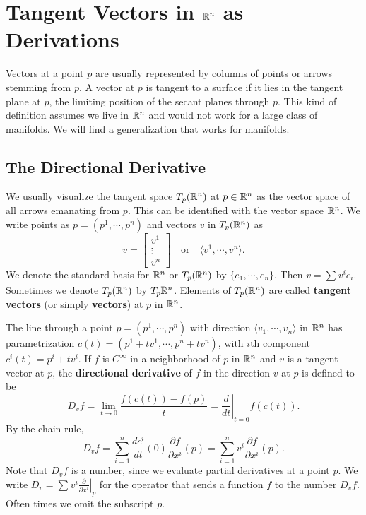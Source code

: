 \section{Tangent Vectors in $\mathbb{R}^n $ as Derivations}
Vectors at a point $p$ are usually represented by columns of points or arrows stemming from $p$. A vector at $p$ is tangent to a surface if it lies in the tangent plane at $p$, the limiting position of the secant planes through $p$. This kind of definition assumes we live in $\mathbb{R}^n $ and would not work for a large class of manifolds. We will find a generalization that works for manifolds.
\subsection{The Directional Derivative}
We usually visualize the tangent space $T_p (\mathbb{R}^n )$ at $p\in \mathbb{R}^n $ as the vector space of all arrows emanating from $p$. This can be identified with the vector space $\mathbb{R}^n $. We write points as $p=(p^1,\cdots ,p^n )$ and vectors $v$ in $T_p(\mathbb{R}^n )$ as \[
v= 
\begin{bmatrix}
    v^1 \\ \vdots \\ v^n 
\end{bmatrix} \quad \text{or} \quad \langle v^1,\cdots ,v^n  \rangle .
\] We denote the standard basis for $\mathbb{R}^n $ or $T_p (\mathbb{R}^n )$ by $\{e_1,\cdots ,e_n \} $. Then $v=\sum_{}^{} v^i e_i .$ Sometimes we denote $T_p(\mathbb{R}^n )$ by $T_p\mathbb{R}^n $. Elements of $T_p (\mathbb{R}^n )$ are called \textbf{tangent vectors} (or simply \textbf{vectors}) at $p$ in $\mathbb{R}^n $.

The line through a point $p=(p^1,\cdots ,p^n )$ with direction $\langle v_1,\cdots ,v_n  \rangle $ in $\mathbb{R}^n $ has parametrization $c(t)=(p^1+tv^1,\cdots ,p^n +tv^n )$, with $i$th component $c^i (t)=p^i +tv^i $. If $f$ is $C^{\infty}$ in a neighborhood of $p$ in $\mathbb{R}^n $ and $v$ is a tangent vector at $p$, the \textbf{directional derivative} of $f$ in the direction $v$ at $p$ is defined to be \[
    D_v f = \lim_{t \to 0} \frac{f(c(t))-f(p)}{t}= \left. \frac{d}{dt} \right| _{t=0}f(c(t)).
\] By the chain rule, \[
D_v f = \sum_{i=1}^{n} \frac{dc^i }{dt}(0)\frac{\partial f}{\partial x^i }(p)=\sum_{i=1}^{n} v^i \frac{\partial f}{\partial x^i }(p).
\] Note that $D_vf$ is a number, since we evaluate partial derivatives at a point $p$. We write $D_v = \sum_{}^{} v^i  \left. \frac{\partial }{\partial x^i } \right| _p$ for the operator that sends a function $f$ to the number $D_v f$. Often times we omit the subscript $p$.
